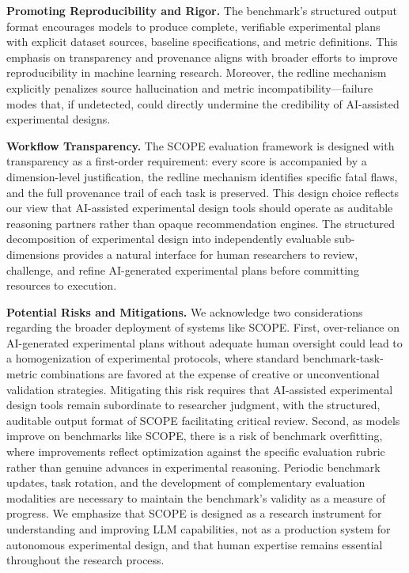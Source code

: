\textbf{Promoting Reproducibility and Rigor.} The benchmark's structured output format encourages models to produce complete, verifiable experimental plans with explicit dataset sources, baseline specifications, and metric definitions. This emphasis on transparency and provenance aligns with broader efforts to improve reproducibility in machine learning research. Moreover, the redline mechanism explicitly penalizes source hallucination and metric incompatibility---failure modes that, if undetected, could directly undermine the credibility of AI-assisted experimental designs.

\textbf{Workflow Transparency.} The \textsc{SCOPE} evaluation framework is designed with transparency as a first-order requirement: every score is accompanied by a dimension-level justification, the redline mechanism identifies specific fatal flaws, and the full provenance trail of each task is preserved. This design choice reflects our view that AI-assisted experimental design tools should operate as auditable reasoning partners rather than opaque recommendation engines. The structured decomposition of experimental design into independently evaluable sub-dimensions provides a natural interface for human researchers to review, challenge, and refine AI-generated experimental plans before committing resources to execution.

\textbf{Potential Risks and Mitigations.} We acknowledge two considerations regarding the broader deployment of systems like \textsc{SCOPE}. First, over-reliance on AI-generated experimental plans without adequate human oversight could lead to a homogenization of experimental protocols, where standard benchmark-task-metric combinations are favored at the expense of creative or unconventional validation strategies. Mitigating this risk requires that AI-assisted experimental design tools remain subordinate to researcher judgment, with the structured, auditable output format of \textsc{SCOPE} facilitating critical review. Second, as models improve on benchmarks like \textsc{SCOPE}, there is a risk of benchmark overfitting, where improvements reflect optimization against the specific evaluation rubric rather than genuine advances in experimental reasoning. Periodic benchmark updates, task rotation, and the development of complementary evaluation modalities are necessary to maintain the benchmark's validity as a measure of progress. We emphasize that \textsc{SCOPE} is designed as a research instrument for understanding and improving LLM capabilities, not as a production system for autonomous experimental design, and that human expertise remains essential throughout the research process.


